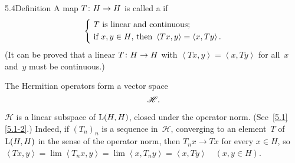 \documentclass[main.tex]{subfiles}
\begin{document}

%
%
\begin{psec}{5.4}{Definition}
A map $T\colon H\rightarrow H$ is called a  if
\begin{equation*}
\left\{\ 
\begin{alignedat}{2}
&T\htam{ is linear and continuous;} \\
&\htam{if }x,y\in H\htam{, then }
\left<Tx,y\right>=\left<x,Ty\right>\htam{.}
\end{alignedat}
\right.
\end{equation*}
(It can be proved that a linear $T\colon H\rightarrow H$ 
with $\left<Tx,y\right>=\left<x,Ty\right>$
for all~$x$ and~$y$ must be continuous.)

The Hermitian operators form a vector space
\begin{equation*}
\mathscr H\text{.}
\end{equation*}

$\mathscr H$ is a linear subspace of $\mathrm{L}(H,H)$,
closed under the operator norm. (See~\ref{5.1}\ref{5.1-2}.)
Indeed,
if $(T_n)_n$ is a sequence in~$\mathscr H$,
converging to an element~$T$ of $\mathrm{L}(H,H)$
in the sense of the operator norm,
then $T_n x\rightarrow Tx$ for every $x\in H$,
so $\left< Tx, y \right> 
= \lim\left< T_n x, y \right>
= \lim\left< x, T_n y \right>
= \left< x, Ty \right>\quad (x,y\in H)$.
\end{psec}
\end{document}
